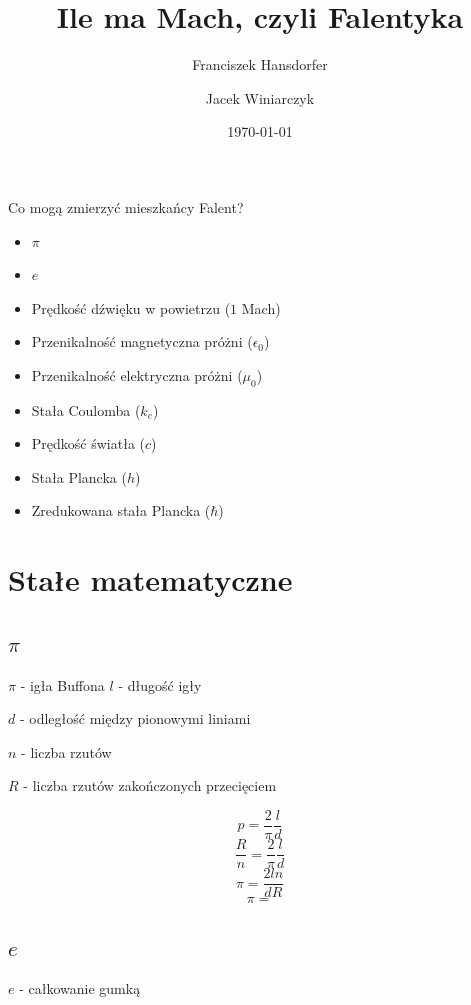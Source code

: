 \documentclass{beamer}
\title{Ile ma Mach, czyli Falentyka}
\author{Franciszek Hansdorfer \and Jacek Winiarczyk}
\institute{Wydiział fizyki doświadczalnej instytutu Marii Mach}
\date{\today}
\begin{document}
\begin{frame}
\titlepage
\end{frame}

\begin{frame}{Co mogą zmierzyć mieszkańcy Falent?}
\begin{itemize}
\item $\pi$
\item $e$
\item Prędkość dźwięku w powietrzu ($1$ Mach)
\item Przenikalność magnetyczna próżni ($\epsilon_0$)
\item Przenikalność elektryczna próżni ($\mu_0$)
\item Stała Coulomba ($k_e$)
\item Prędkość światła ($c$)
\item Stała Plancka ($h$)
\item Zredukowana stała Plancka ($\hbar$)
\end{itemize}

\end{frame}

\section{Stałe matematyczne}

\subsection{$\pi$}

\begin{frame}{$\pi$ - igła Buffona}
$l$ - długość igły

$d$ - odległość między pionowymi liniami

$n$ - liczba rzutów

$R$ - liczba rzutów zakończonych przecięciem

$$p = \frac{2}{\pi} \frac{l}{d}$$
$$\frac{R}{n} = \frac{2}{\pi}\frac{l}{d}$$
$$\pi = \frac{2 l n}{d R}$$
$$\pi =$$

\end{frame}

\subsection{$e$}

\begin{frame}{$e$ - całkowanie gumką}

\end{frame}
\end{document}
